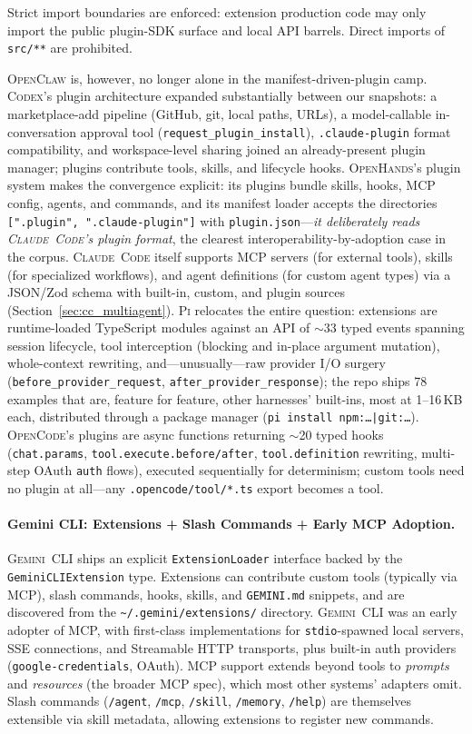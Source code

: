 \documentclass[11pt,a4paper]{article}
\newcommand{\clcode}{\textsc{Claude~Code}\xspace}
\newcommand{\cdx}{\textsc{Codex}\xspace}
\newcommand{\oh}{\textsc{OpenHands}\xspace}
\newcommand{\ocl}{\textsc{OpenClaw}\xspace}
\newcommand{\gemini}{\textsc{Gemini~CLI}\xspace}
\newcommand{\pib}{\textsc{Pi}\xspace}
\newcommand{\ocd}{\textsc{OpenCode}\xspace}
\begin{document}
Strict import boundaries are enforced: extension production code may only import the public plugin-SDK surface and local API barrels.
Direct imports of \texttt{src/**} are prohibited.

\ocl{} is, however, no longer alone in the manifest-driven-plugin camp.
\cdx{}'s plugin architecture expanded substantially between our snapshots: a marketplace-add pipeline (GitHub, git, local paths, URLs), a model-callable in-conversation approval tool (\texttt{request\_plugin\_install}), \texttt{.claude-plugin} format compatibility, and workspace-level sharing joined an already-present plugin manager; plugins contribute tools, skills, and lifecycle hooks.
\oh{}'s plugin system makes the convergence explicit: its plugins bundle skills, hooks, MCP config, agents, and commands, and its manifest loader accepts the directories \texttt{[".plugin", ".claude-plugin"]} with \texttt{plugin.json}---\emph{it deliberately reads \clcode{}'s plugin format}, the clearest interoperability-by-adoption case in the corpus.
\clcode{} itself supports MCP servers (for external tools), skills (for specialized workflows), and agent definitions (for custom agent types) via a JSON/Zod schema with built-in, custom, and plugin sources (Section~\ref{sec:cc_multiagent}).
\pib{} relocates the entire question: extensions are runtime-loaded TypeScript modules against an API of $\sim$33 typed events spanning session lifecycle, tool interception (blocking and in-place argument mutation), whole-context rewriting, and---unusually---raw provider I/O surgery (\texttt{before\_provider\_request}, \texttt{after\_provider\_response}); the repo ships 78 examples that are, feature for feature, other harnesses' built-ins, most at 1--16\,KB each, distributed through a package manager (\texttt{pi install npm:\ldots|git:\ldots}).
\ocd{}'s plugins are async functions returning $\sim$20 typed hooks (\texttt{chat.params}, \texttt{tool.execute.before/after}, \texttt{tool.definition} rewriting, multi-step OAuth \texttt{auth} flows), executed sequentially for determinism; custom tools need no plugin at all---any \texttt{.opencode/tool/*.ts} export becomes a tool.

\paragraph{Gemini CLI: Extensions + Slash Commands + Early MCP Adoption.}
\gemini{} ships an explicit \texttt{ExtensionLoader} interface backed by the \texttt{GeminiCLIExtension} type.
Extensions can contribute custom tools (typically via MCP), slash commands, hooks, skills, and \texttt{GEMINI.md} snippets, and are discovered from the \texttt{\textasciitilde/.gemini/extensions/} directory.
\gemini{} was an early adopter of MCP, with first-class implementations for \texttt{stdio}-spawned local servers, SSE connections, and Streamable HTTP transports, plus built-in auth providers (\texttt{google-credentials}, OAuth).
MCP support extends beyond tools to \emph{prompts} and \emph{resources} (the broader MCP spec), which most other systems' adapters omit.
Slash commands (\texttt{/agent}, \texttt{/mcp}, \texttt{/skill}, \texttt{/memory}, \texttt{/help}) are themselves extensible via skill metadata, allowing extensions to register new commands.
\end{document}
